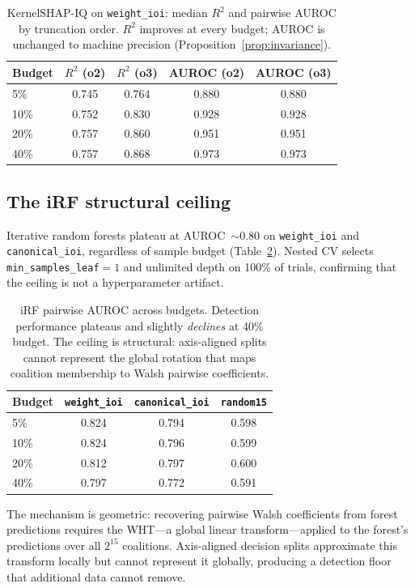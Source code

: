 \documentclass[11pt]{article}
\begin{document}
\begin{table}[t]
\centering
\caption{KernelSHAP-IQ on \texttt{weight\_ioi}: median $R^2$ and
pairwise AUROC by truncation order. $R^2$ improves at every budget;
AUROC is unchanged to machine precision
(Proposition~\ref{prop:invariance}).}
\label{tab:order-effect}
\begin{tabular}{lcccc}
\toprule
Budget & $R^2$ (o2) & $R^2$ (o3) & AUROC (o2) & AUROC (o3) \\
\midrule
5\%  & 0.745 & 0.764 & 0.880 & 0.880 \\
10\% & 0.752 & 0.830 & 0.928 & 0.928 \\
20\% & 0.757 & 0.860 & 0.951 & 0.951 \\
40\% & 0.757 & 0.868 & 0.973 & 0.973 \\
\bottomrule
\end{tabular}
\end{table}


\subsection{The iRF structural ceiling}
\label{sec:irf-ceiling}

Iterative random forests plateau at AUROC~$\sim 0.80$ on
\texttt{weight\_ioi} and \texttt{canonical\_ioi}, regardless of
sample budget (Table~\ref{tab:irf-ceiling}). Nested CV selects
\texttt{min\_samples\_leaf}$=1$ and unlimited depth on 100\% of
trials, confirming that the ceiling is not a hyperparameter artifact.

\begin{table}[t]
\centering
\caption{iRF pairwise AUROC across budgets. Detection performance
plateaus and slightly \emph{declines} at 40\% budget. The ceiling
is structural: axis-aligned splits cannot represent the global
rotation that maps coalition membership to Walsh pairwise coefficients.}
\label{tab:irf-ceiling}
\begin{tabular}{lccc}
\toprule
Budget & \texttt{weight\_ioi} & \texttt{canonical\_ioi} & \texttt{random15} \\
\midrule
5\%  & 0.824 & 0.794 & 0.598 \\
10\% & 0.824 & 0.796 & 0.599 \\
20\% & 0.812 & 0.797 & 0.600 \\
40\% & 0.797 & 0.772 & 0.591 \\
\bottomrule
\end{tabular}
\end{table}

The mechanism is geometric: recovering pairwise Walsh coefficients
from forest predictions requires the WHT---a global linear
transform---applied to the forest's predictions over all $2^{15}$
coalitions. Axis-aligned decision splits approximate this transform
locally but cannot represent it globally, producing a detection floor
that additional data cannot remove.
\end{document}
